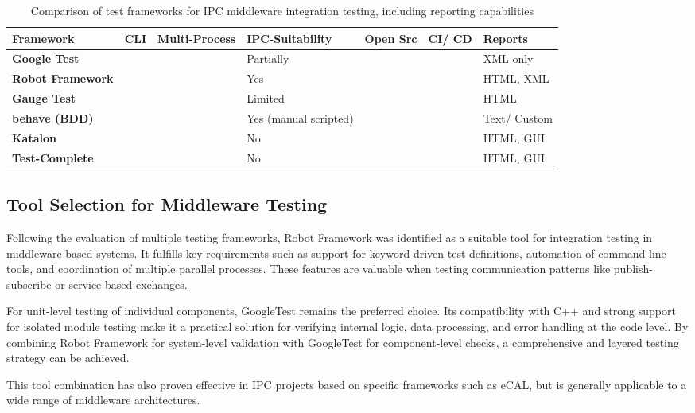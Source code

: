 \begin{table}[H]
	\centering
	\renewcommand{\arraystretch}{1.4}
	\begin{tabular}{|p{2.31cm}|p{1cm}|p{1.7cm}|p{2.1cm}|p{1cm}|p{1cm}|p{1.7cm}|}
		\hline
		\textbf{Framework} & \textbf{CLI} & \textbf{Multi-Process} & \textbf{IPC-Suitability} & \textbf{Open Src} & \textbf{CI/ CD} & \textbf{Reports} \\
		\hline
		\textbf{Google Test}         & \cmark & \xmark  & Partially               & \cmark & \cmark & XML only \\
		\hline
		\textbf{Robot Framework}     & \cmark & \cmark  & Yes                     & \cmark & \cmark & HTML, XML \\
		\hline
		\textbf{Gauge Test}          & \cmark & \xmark  & Limited                 & \cmark & \cmark & HTML \\
		\hline
		\textbf{behave (BDD)}        & \cmark & \xmark  & Yes (manual scripted)            & \cmark & \cmark & Text/ Custom \\
		\hline
		\textbf{Katalon}             & \xmark & \xmark  & No                      & \xmark & \xmark & HTML, GUI \\
		\hline
		\textbf{Test-Complete}        & \xmark & \xmark  & No                      & \xmark & \xmark & HTML, GUI \\
		\hline
	\end{tabular}
	\caption{Comparison of test frameworks for IPC middleware integration testing, including reporting capabilities}
	\label{tab:framework_comparison_reporting}
\end{table}


\subsection{Tool Selection for Middleware Testing}

Following the evaluation of multiple testing frameworks, Robot Framework was identified as a suitable tool for integration testing in middleware-based systems. It fulfills key requirements such as support for keyword-driven test definitions, automation of command-line tools, and coordination of multiple parallel processes. These features are valuable when testing communication patterns like publish-subscribe or service-based exchanges.

\vspace{1em}
For unit-level testing of individual components, GoogleTest remains the preferred choice. Its compatibility with C++ and strong support for isolated module testing make it a practical solution for verifying internal logic, data processing, and error handling at the code level. By combining Robot Framework for system-level validation with GoogleTest for component-level checks, a comprehensive and layered testing strategy can be achieved.

\vspace{1em}
This tool combination has also proven effective in IPC projects based on specific frameworks such as eCAL, but is generally applicable to a wide range of middleware architectures.

